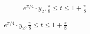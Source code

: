 \documentclass[11pt]{article}
\begin{document}
\begin{figure}
\begin{subfigure}[b]{0.45\textwidth}
                \caption{$ e^{\pi /4} \cdot y_2 , \frac{\pi }{8}\leq t \leq 1+\frac{\pi }{8} $}
        \end{subfigure}
\end{figure}
\end{document}
